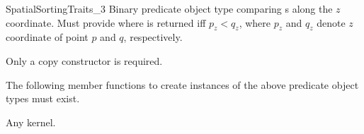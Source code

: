 \begin{ccRefConcept}{SpatialSortingTraits_3}
%
       {Binary predicate object type comparing s
        along the $z$ coordinate.
        Must provide 
         where 
        is returned iff $p_z < q_z$,
        where $p_z$ and $q_z$ denote $z$ coordinate of point $p$ and $q$,
        respectively.
       }


\ccCreation
{}  %

Only a copy constructor is required.


\ccOperations

The following member functions to create instances of the above predicate
object types must exist. 

\setlength\parskip{0mm}
\ccGlue
{}
\ccGlue 
{}
\ccGlue
{}
\ccGlue
{}
\ccGlue
{}

\ccParDims
\ccHasModels

Any \cgal{} kernel.

\ccParDims
\end{ccRefConcept}


